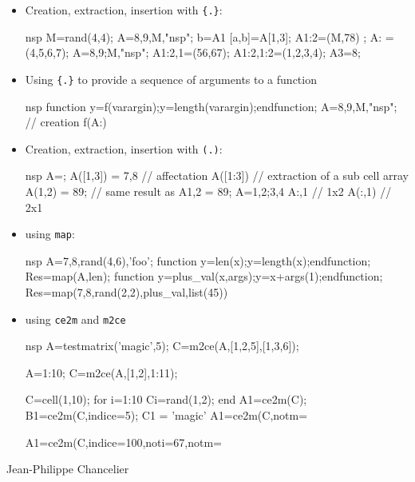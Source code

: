 \begin{examples}
\begin{itemize}
\item Creation, extraction, insertion with \verb+{.}+:
\begin{mintednsp}{nsp}
  M=rand(4,4);
  A={8,9,M,"nsp"};  
  b=A{1} 	
  [a,b]=A{[1,3]};
  A{1:2}=(M,78) ; 
  A{:} = (4,5,6,7); 
  A={8,9;M,"nsp"};  
  A{1:2,1}=(56,67);
  A{1:2,1:2}=(1,2,3,4);
  A{3}=8;
\end{mintednsp}

\item Using \verb+{.}+ to provide a sequence of arguments to a function
\begin{mintednsp}{nsp} 
  function y=f(varargin);y=length(varargin);endfunction;
  A={8,9,M,"nsp"}; // creation 
  f(A{:})
\end{mintednsp}
\item Creation, extraction, insertion with \verb+(.)+:
\begin{mintednsp}{nsp}
  A={}; 
  A([1,3]) = {7,8} // affectation 
  A([1:3]) // extraction of a sub cell array
  A(1,2) = {89};  // same result as A{1,2} = 89;
  A={1,2;3,4}
  { A{:,1}}   // 1x2 
  A(:,1)      // 2x1 
\end{mintednsp}

\item using \verb+map+:
\begin{mintednsp}{nsp}
  A={7,8,rand(4,6),'foo'}; 
  function y=len(x);y=length(x);endfunction;
  Res=map(A,len);
  function y=plus_val(x,args);y=x+args(1);endfunction;
  Res=map({7,8,rand(2,2)},plus_val,list(45))
\end{mintednsp}

\item using \verb!ce2m! and \verb!m2ce!

\begin{mintednsp}{nsp}
  A=testmatrix('magic',5);
  C=m2ce(A,[1,2,5],[1,3,6]);

  A=1:10;
  C=m2ce(A,[1,2],1:11);
  
  C=cell(1,10);
  for i=1:10 
    C{i}=rand(1,2);
  end 
  A1=ce2m(C);
  B1=ce2m(C,indice=5); 
  C{1} = 'magic'
  A1=ce2m(C,notm=%
  
  A1=ce2m(C,indice=100,noti=67,notm=%
\end{mintednsp}

\end{itemize}

\end{examples}

\begin{authors}
  Jean-Philippe Chancelier
\end{authors}





